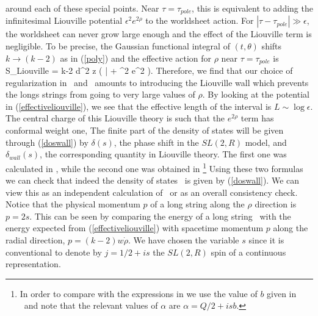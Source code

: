 around each of these special points. Near $\tau = \tau_{pole}$,
this is equivalent to adding the infinitesimal Liouville 
potential $\epsilon^2 e^{2\rho}$ to the worldsheet action. For
$|\tau - \tau_{pole}| \gg \epsilon$, the worldsheet can never
grow large enough and the effect of the Liouville term is
negligible. To be precise, the Gaussian functional 
integral of $(t,\theta)$ shifts $k \rightarrow (k-2)$ as
in (\ref{poly}) and the effective action for $\rho$ near
$\tau = \tau_{pole}$ is 
\ber \label{effectiveliouville}
  S_{Liouville} = {k-2 \over \pi} \int d^2 z \left( 
\partial \rho \bar{\partial} \rho + \epsilon^2 e^{2\rho} \right).
\eer
Therefore, we find that our choice of regularization 
in \divlong\ and \densecond\ amounts to introducing the Liouville
wall which prevents the longs strings from going to very 
large values of $\rho$. By looking at the potential in 
(\ref{effectiveliouville}), we 
see that the effective length of the interval is $ L \sim 
\log \epsilon $.
The central charge of this Liouville theory is such that the $e^{2 \rho}$ 
term has conformal weight one, 
The finite part of the density of states will be given through 
(\ref{doswall}) by  $\delta(s)$, the phase shift in the $SL(2,R)$ model,
and $\delta_{wall}(s)$, the corresponding quantity in Liouville theory. 
The first one was calculated in \cite{Teschner:1997ft,zamnotes},
while the second one was obtained in 
\cite{Dorn:1994xn,Zamolodchikov:1996aa}\footnote{
In order to compare with the expressions in \cite{Dorn:1994xn,
Zamolodchikov:1996aa} we use the value of 
$b$ given in \cenliou\ and note that the relevant values of 
$\alpha$ are $\alpha = Q/2 + i s b$.}
Using these two formulas we can check that indeed the  density of states
\density\  is given by (\ref{doswall}). 
We can view this as an independent calculation of \sltwoph\ or
as an overall consistency check. 
Notice that the physical momentum $p$ of a long string along the 
$\rho$ direction is $p=2s$. This can be seen by comparing 
the energy of a long string \econt\  with the energy expected from 
(\ref{effectiveliouville}) 
with spacetime momentum $p$ along the radial direction,
$p = (k-2) w \dot \rho $.  We have chosen the variable 
 $s$ since it is conventional to
denote by $j = 1/2 + i s $ the $SL(2,R)$ spin of a continuous representation. 



